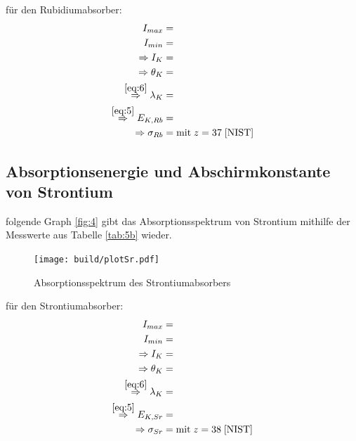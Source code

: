     \justifying für den Rubidiumabsorber:
    \begin{subequations}\label{eq:23}
    \begin{align}
        I_{max} &= \text{} \label{eq:23a}\\
        I_{min} &= \text{} \label{eq:23b}\\
        \Rightarrow I_K &= \text{} \label{eq:23c}\\
        \Rightarrow \theta_K &= \text{} \label{eq:23d}\\
        \stackrel{\eqref{eq:6}}{\Rightarrow} \lambda_K &= \text{} \label{eq:23e}\\
        \stackrel{\eqref{eq:5}}{\Rightarrow} E_{K,Rb} &= \text{} \label{eq:23f}\\
        \Rightarrow \sigma_{Rb} &= \text{} \text{mit}\; z=37\; \text{\cite{NIST}} \label{eq:23g}
    \end{align}
    \end{subequations}

\subsection{Absorptionsenergie und Abschirmkonstante von Strontium}

    \justifying folgende Graph \ref{fig:4} gibt das Absorptionsspektrum von Strontium mithilfe der Messwerte aus Tabelle \ref{tab:5b} 
    wieder.

    \begin{figure}[H]
        \centering
        \texttt{[image: build/plotSr.pdf]}
        \caption{Absorptionsspektrum des Strontiumabsorbers}
        \label{fig:7}
    \end{figure}

    \justifying für den Strontiumabsorber:
    \begin{subequations}\label{eq:24}
    \begin{align}
        I_{max} &= \text{} \label{eq:24a}\\
        I_{min} &= \text{} \label{eq:24b}\\
        \Rightarrow I_K &= \text{} \label{eq:24c}\\
        \Rightarrow \theta_K &= \text{} \label{eq:24d}\\
        \stackrel{\eqref{eq:6}}{\Rightarrow} \lambda_K &= \text{} \label{eq:24e}\\
        \stackrel{\eqref{eq:5}}{\Rightarrow} E_{K,Sr} &= \text{} \label{eq:24f}\\
        \Rightarrow \sigma_{Sr} &= \text{} \text{mit}\; z=38\; \text{\cite{NIST}} \label{eq:24g}
    \end{align}
    \end{subequations}

